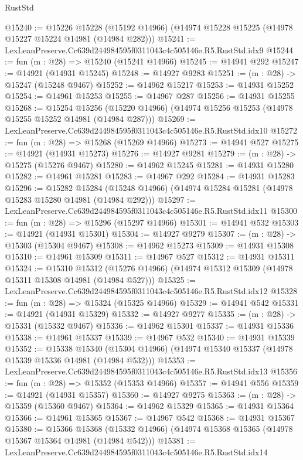 \begin{lexlean}{RustStd}
\begin{coremodule}
@15240 := @15226
    @15228
    (@15192 @14966)
    (@14974 @15228 @15225 (@14978 @15227 @15224 @14981 (@14984 @282)))
@15241 := LexLeanPreserve.Cc639d244984595f0311043c4c505146e.R5.RustStd.idx9
@15244 := fun (m : @28) => @15240 (@15241 @14966)
@15245 := @14941 @292
@15247 := @14921 (@14931 @15245)
@15248 := @14927 @9283
@15251 := (m : @28) -> @15247 (@15248 @9467)
@15252 := @14962 @15217
@15253 := @14931 @15252
@15254 := @14961 @15253
@15255 := @14967 @287
@15256 := @14931 @15255
@15268 := @15254
    @15256
    (@15220 @14966)
    (@14974 @15256 @15253 (@14978 @15255 @15252 @14981 (@14984 @287)))
@15269 := LexLeanPreserve.Cc639d244984595f0311043c4c505146e.R5.RustStd.idx10
@15272 := fun (m : @28) => @15268 (@15269 @14966)
@15273 := @14941 @527
@15275 := @14921 (@14931 @15273)
@15276 := @14927 @9281
@15279 := (m : @28) -> @15275 (@15276 @9467)
@15280 := @14962 @15245
@15281 := @14931 @15280
@15282 := @14961 @15281
@15283 := @14967 @292
@15284 := @14931 @15283
@15296 := @15282
    @15284
    (@15248 @14966)
    (@14974 @15284 @15281 (@14978 @15283 @15280 @14981 (@14984 @292)))
@15297 := LexLeanPreserve.Cc639d244984595f0311043c4c505146e.R5.RustStd.idx11
@15300 := fun (m : @28) => @15296 (@15297 @14966)
@15301 := @14941 @532
@15303 := @14921 (@14931 @15301)
@15304 := @14927 @9279
@15307 := (m : @28) -> @15303 (@15304 @9467)
@15308 := @14962 @15273
@15309 := @14931 @15308
@15310 := @14961 @15309
@15311 := @14967 @527
@15312 := @14931 @15311
@15324 := @15310
    @15312
    (@15276 @14966)
    (@14974 @15312 @15309 (@14978 @15311 @15308 @14981 (@14984 @527)))
@15325 := LexLeanPreserve.Cc639d244984595f0311043c4c505146e.R5.RustStd.idx12
@15328 := fun (m : @28) => @15324 (@15325 @14966)
@15329 := @14941 @542
@15331 := @14921 (@14931 @15329)
@15332 := @14927 @9277
@15335 := (m : @28) -> @15331 (@15332 @9467)
@15336 := @14962 @15301
@15337 := @14931 @15336
@15338 := @14961 @15337
@15339 := @14967 @532
@15340 := @14931 @15339
@15352 := @15338
    @15340
    (@15304 @14966)
    (@14974 @15340 @15337 (@14978 @15339 @15336 @14981 (@14984 @532)))
@15353 := LexLeanPreserve.Cc639d244984595f0311043c4c505146e.R5.RustStd.idx13
@15356 := fun (m : @28) => @15352 (@15353 @14966)
@15357 := @14941 @556
@15359 := @14921 (@14931 @15357)
@15360 := @14927 @9275
@15363 := (m : @28) -> @15359 (@15360 @9467)
@15364 := @14962 @15329
@15365 := @14931 @15364
@15366 := @14961 @15365
@15367 := @14967 @542
@15368 := @14931 @15367
@15380 := @15366
    @15368
    (@15332 @14966)
    (@14974 @15368 @15365 (@14978 @15367 @15364 @14981 (@14984 @542)))
@15381 := LexLeanPreserve.Cc639d244984595f0311043c4c505146e.R5.RustStd.idx14

\end{coremodule}
\end{lexlean}
